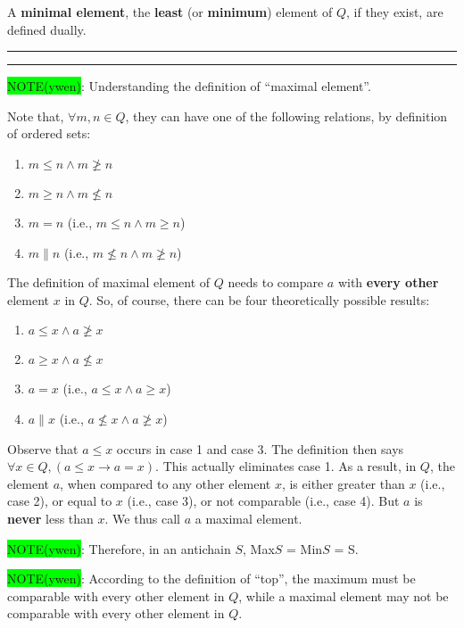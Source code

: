 \documentclass[12pt, letterpaper, oneside]{book}
\begin{document}
A \textbf{minimal element}, the \textbf{least} (or \textbf{minimum}) element of $Q$, if they exist, are defined dually.

\noindent\rule[-9pt]{1cm}{10pt}\rule{10cm}{0.4pt}

\colorbox{lime}{NOTE(ywen)}: Understanding the definition of ``maximal element''.

Note that, $\forall m, n \in Q$, they can have one of the following relations, by definition of ordered sets:
\begin{enumerate}
  \item $m \leqslant n \land m \ngeqslant n$
  \item $m \geqslant n \land m \nleqslant n$
  \item $m = n$ (i.e., $m \leqslant n \land m \geqslant n$)
  \item $m \parallel n$ (i.e., $m \nleqslant n \land m \ngeqslant n$)
\end{enumerate}

The definition of maximal element of $Q$ needs to compare $a$ with \textbf{every other} element $x$ in $Q$. So, of
course, there can be four theoretically possible results:
\begin{enumerate}
  \item $a \leqslant x \land a \ngeqslant x$
  \item $a \geqslant x \land a \nleqslant x$
  \item $a = x$ (i.e., $a \leqslant x \land a \geqslant x$)
  \item $a \parallel x$ (i.e., $a \nleqslant x \land a \ngeqslant x$)
\end{enumerate}

Observe that $a \leqslant x$ occurs in case 1 and case 3. The definition then says $\forall x \in Q, (a \leqslant x
  \rightarrow a = x)$. This actually eliminates case 1. As a result, in $Q$, the element $a$, when compared to any other
element $x$, is either greater than $x$ (i.e., case 2), or equal to $x$ (i.e., case 3), or not comparable (i.e., case
4). But $a$ is \textbf{never} less than $x$. We thus call $a$ a maximal element.

\colorbox{lime}{NOTE(ywen)}: Therefore, in an antichain $S$, Max$S$ = Min$S$ = S.

\colorbox{lime}{NOTE(ywen)}: According to the definition of ``top'', the maximum must be comparable with every other
element in $Q$, while a maximal element may not be comparable with every other element in $Q$.
\end{document}
